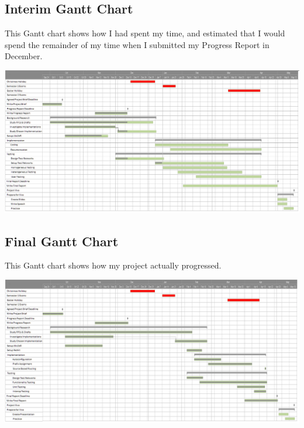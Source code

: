 \pagebreak
\begin{landscape} 
\subsection{Interim Gantt Chart}
This Gantt chart shows how I had spent my time, and estimated that I would
spend the remainder of my time when I submitted my Progress Report in December. 

\begin{center}
  \hspace*{-0.75cm}
  \includegraphics[width=1.\linewidth]{../Gantt/EvenBetterDec.png}
\end{center}

\pagebreak

\subsection{Final Gantt Chart}
This Gantt chart shows how my project actually progressed.

\begin{center}
  \hspace*{-0.75cm}
  \includegraphics[width=1.\linewidth]{../Gantt/EvenBetterApril.png}
\end{center}

\end{landscape}

